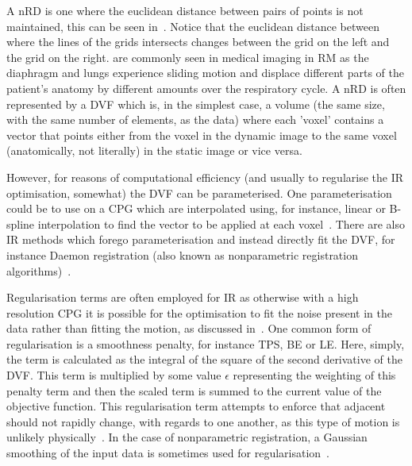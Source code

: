                 A \gls{nRD} is one where the euclidean distance between pairs of points is not maintained, this can be seen in~. Notice that the euclidean distance between where the lines of the grids intersects changes between the grid on the left and the grid on the right. %
                 are commonly seen in medical imaging in \gls{RM} as the diaphragm and lungs experience sliding motion and displace different parts of the patient's anatomy by different amounts over the respiratory cycle. A \gls{nRD} is often represented by a \gls{DVF} which is, in the simplest case, a volume (the same size, with the same number of elements, as the data) where each 'voxel' contains a vector that points either from the voxel in the dynamic image to the same voxel (anatomically, not literally) in the static image or vice versa.
                
                However, for reasons of computational efficiency (and usually to regularise the \gls{IR} optimisation, somewhat) the \gls{DVF} can be parameterised. One parameterisation could be to use  on a \gls{CPG} which are interpolated using, for instance, linear or B-spline interpolation to find the vector to be applied at each voxel~\parencite{Bardinet1996, Rueckertetal.1999, Mattes2003, JacobsonFesslerMotionCorrectionBib}. There are also \gls{IR} methods which forego parameterisation and instead directly fit the \gls{DVF}, for instance Daemon registration (also known as nonparametric registration algorithms)~\parencite{Vercauteren2009DiffeomorphicRegistration.}.
                
                Regularisation terms are often employed for  \gls{IR} as otherwise with a high resolution \gls{CPG} it is possible for the optimisation to fit the noise present in the data rather than fitting the motion, as discussed in~. One common form of regularisation is a smoothness penalty, for instance \gls{TPS}, \gls{BE} or \gls{LE}. Here, simply, the term is calculated as the integral of the square of the second derivative of the \gls{DVF}. This term is multiplied by some value $\epsilon$ representing the weighting of this penalty term and then the scaled term is summed to the current value of the objective function. This regularisation term attempts to enforce that adjacent  should not rapidly change, with regards to one another, as this type of motion is unlikely physically~\parencite{Duchon1977SplinesSpaces}. In the case of nonparametric registration, a Gaussian smoothing of the input data is sometimes used for regularisation~\parencite{Vercauteren2009DiffeomorphicRegistration.}.
        
